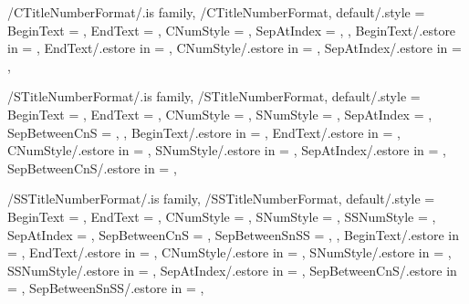 
\pgfkeys
{
  /CTitleNumberFormat/.is family, /CTitleNumberFormat,
  default/.style =
  {
    BeginText = \empty,
    EndText = \empty,
    CNumStyle = \empty,
    SepAtIndex = \empty,
  },
  BeginText/.estore in = \GetCTitleNumberFormatBeginText,
  EndText/.estore in = \GetCTitleNumberFormatEndText,
  CNumStyle/.estore in = \GetCTitleNumberFormatCNumStyle,
  SepAtIndex/.estore in = \GetCTitleNumberFormatSepAtIndex,
} %

\newcommand\GetChapterTitleNumberFormatString{}
\newcommand\SetupChapterTitleNumberFormatString
{%
  \SetupTitleNumberFormatString{Chapter}%
  {%
    BeginText=\GetCTitleNumberFormatBeginText,%
    EndText=\GetCTitleNumberFormatEndText,%
    CNumStyle=\GetCTitleNumberFormatCNumStyle,%
    CCounterName=chapter,%
  }{\GetChapterTitleNumberFormatString}%
} %


\pgfkeys
{
  /STitleNumberFormat/.is family, /STitleNumberFormat,
  default/.style =
  {
    BeginText = \empty,
    EndText = \empty,
    CNumStyle = \empty,
    SNumStyle = \empty,
    SepAtIndex = \empty, %
    SepBetweenCnS = \empty, %
  },
  BeginText/.estore in = \GetSTitleNumberFormatBeginText,
  EndText/.estore in = \GetSTitleNumberFormatEndText,
  CNumStyle/.estore in = \GetSTitleNumberFormatCNumStyle,
  SNumStyle/.estore in = \GetSTitleNumberFormatSNumStyle,
  SepAtIndex/.estore in = \GetSTitleNumberFormatSepAtIndex,
  SepBetweenCnS/.estore in = \GetSTitleNumberFormatSepBetweenCnS,
} %

\newcommand\GetSectionTitleNumberFormatString{}
\newcommand\SetupSectionTitleNumberFormatString
{%
  \SetupTitleNumberFormatString{Section}%
  {%
    BeginText=\GetSTitleNumberFormatBeginText,%
    EndText=\GetSTitleNumberFormatEndText,%
    CNumStyle=\GetSTitleNumberFormatCNumStyle,%
    SNumStyle=\GetSTitleNumberFormatSNumStyle,%
    SepAtIndex=\GetSTitleNumberFormatSepAtIndex,%
    SepBetweenCnS=\GetSTitleNumberFormatSepBetweenCnS,%
    CCounterName=chapter,%
    SCounterName=section,%
  }{\GetSectionTitleNumberFormatString}%
} %


\pgfkeys
{
  /SSTitleNumberFormat/.is family, /SSTitleNumberFormat,
  default/.style =
  {
    BeginText = \empty,
    EndText = \empty,
    CNumStyle = \empty,
    SNumStyle = \empty,
    SSNumStyle = \empty,
    SepAtIndex = \empty, %
    SepBetweenCnS = \empty, %
    SepBetweenSnSS = \empty, %
  },
  BeginText/.estore in = \GetSSTitleNumberFormatBeginText,
  EndText/.estore in = \GetSSTitleNumberFormatEndText,
  CNumStyle/.estore in = \GetSSTitleNumberFormatCNumStyle,
  SNumStyle/.estore in = \GetSSTitleNumberFormatSNumStyle,
  SSNumStyle/.estore in = \GetSSTitleNumberFormatSSNumStyle,
  SepAtIndex/.estore in = \GetSSTitleNumberFormatSepAtIndex,
  SepBetweenCnS/.estore in = \GetSSTitleNumberFormatSepBetweenCnS,
  SepBetweenSnSS/.estore in = \GetSSTitleNumberFormatSepBetweenSnSS,
} %

